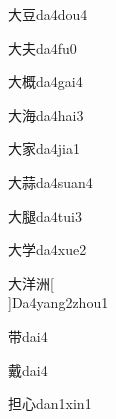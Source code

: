 \begin{verbete}[3;7]{大豆}{da4dou4}
\end{verbete}

\begin{verbete}[3;4]{大夫}{da4fu0}
\end{verbete}

\begin{verbete}[3;13]{大概}{da4gai4}
\end{verbete}

\begin{verbete}[3;10]{大海}{da4hai3}
\end{verbete}

\begin{verbete}[3;10]{大家}{da4jia1}
\end{verbete}

\begin{verbete}[3;13]{大蒜}{da4suan4}
\end{verbete}

\begin{verbete}[3;13]{大腿}{da4tui3}
\end{verbete}

\begin{verbete}[3;8]{大学}{da4xue2}
\end{verbete}

\begin{verbete}[3;9;9]{大洋洲}[\\]{Da4yang2zhou1}
\end{verbete}

\begin{verbete}[9]{带}{dai4}
\end{verbete}

\begin{verbete}[17]{戴}{dai4}
\end{verbete}

\begin{verbete}[8;4]{担心}{dan1xin1}
\end{verbete}

